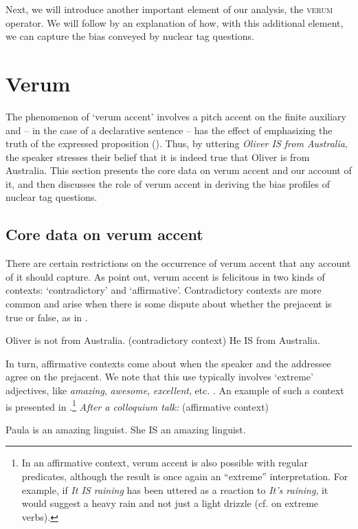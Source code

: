 \documentclass[output=paper,colorlinks,citecolor=brown]{langscibook}
\begin{document}
Next, we will introduce another important element of our analysis, the \textsc{verum} operator. We will follow by an explanation of how, with this additional element, we can capture the bias conveyed by nuclear tag questions.

\section{Verum}\label{Sect4}
The phenomenon of `verum accent' involves a pitch accent on the finite auxiliary and -- in the case of a declarative sentence -- has the effect of emphasizing the truth of the expressed proposition (\citealt{Hohle1992}). Thus, by uttering \textit{Oliver IS from Australia}, the speaker stresses their belief that it is indeed true that Oliver is from Australia. This section presents the core data on verum accent and our account of it, and then discusses the role of verum accent in deriving the bias profiles of nuclear tag questions.

\subsection{Core data on verum accent}\label{VrmData}
There are certain restrictions on the occurrence of verum accent that any account of it should capture. As \citet{Gutzmann2020} point out, verum accent is felicitous in two kinds of contexts: `contradictory' and `affirmative'. Contradictory contexts are more common and arise when there is some dispute about whether the prejacent is true or false, as  in .  
\is{}
\ea\label{Vrm.Contr.Eg}
    \begin{xlist}
     Oliver is not from Australia.  \hfill (contradictory context)
	 He IS from Australia.   
	\end{xlist}
\z
\il{}

In turn, affirmative contexts come about when the speaker and the addressee agree on the prejacent. We note that this use typically involves `extreme' adjectives, like \textit{amazing}, \textit{awesome}, \textit{}\textit{excellent}, etc. \citep{Cruse1986, Paradis2001, Rett2008, Morzycki2012}. An example of such a context is presented in .\footnote{In an affirmative context, verum accent is also possible  with regular predicates, although the result is once again an ``extreme'' interpretation. For example, if \textit{It IS raining} has been uttered as a reaction to \textit{It's raining}, it would suggest a heavy rain and not just a light drizzle (cf. \citealt{Umbach2011} on extreme verbs).}  
\is{}
\ea \textit{After a colloquium talk:}     \hfill (affirmative context)\label{Vrm.Aff.Eg}
    \begin{xlist}
     Paula is an amazing linguist.           
	 She IS an amazing linguist. 
    \end{xlist}
\z
\il{}
\end{document}
